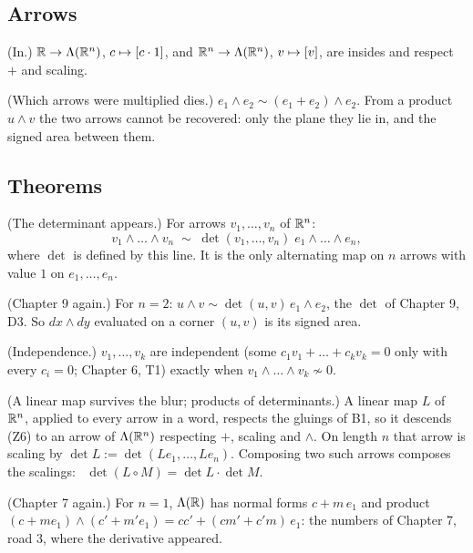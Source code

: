 \subsection*{Arrows}

\begin{lines}
\item[\lab{P5}] (In.) $\mathbb{R} \to \Lambda(\mathbb{R}^n)$, $c \mapsto [c \cdot 1]$, and $\mathbb{R}^n \to \Lambda(\mathbb{R}^n)$, $v \mapsto [v]$, are insides and respect $+$ and scaling.
\item[\lab{P6}] (Which arrows were multiplied dies.) $e_1 \wedge e_2 \sim (e_1 + e_2) \wedge e_2$. From a product $u \wedge v$ the two arrows cannot be recovered: only the plane they lie in, and the signed area between them.
\end{lines}

\subsection*{Theorems}

\begin{lines}
\item[\lab{T1}] (The determinant appears.) For arrows $v_1, \dots, v_n$ of $\mathbb{R}^n$:
\[
v_1 \wedge \dots \wedge v_n \;\sim\; \det(v_1, \dots, v_n)\; e_1 \wedge \dots \wedge e_n,
\]
where $\det$ is defined by this line. It is the only alternating map on $n$ arrows with value $1$ on $e_1, \dots, e_n$.
\item[\lab{T2}] (Chapter 9 again.) For $n = 2$: $u \wedge v \sim \det(u, v)\, e_1 \wedge e_2$, the $\det$ of Chapter 9, D3. So $dx \wedge dy$ evaluated on a corner $(u, v)$ is its signed area.
\item[\lab{T3}] (Independence.) $v_1, \dots, v_k$ are independent (some $c_1 v_1 + \dots + c_k v_k = 0$ only with every $c_i = 0$; Chapter 6, T1) exactly when $v_1 \wedge \dots \wedge v_k \not\sim 0$.
\item[\lab{T4}] (A linear map survives the blur; products of determinants.) A linear map $L$ of $\mathbb{R}^n$, applied to every arrow in a word, respects the gluings of B1, so it descends (Z6) to an arrow of $\Lambda(\mathbb{R}^n)$ respecting $+$, scaling and $\wedge$. On length $n$ that arrow is scaling by $\det L := \det(L e_1, \dots, L e_n)$. Composing two such arrows composes the scalings: \ $\det(L \circ M) = \det L \cdot \det M$.
\item[\lab{T5}] (Chapter 7 again.) For $n = 1$, $\Lambda(\mathbb{R})$ has normal forms $c + m\,e_1$ and product $(c + m e_1) \wedge (c' + m' e_1) = cc' + (cm' + c'm)\,e_1$: the numbers of Chapter 7, road 3, where the derivative appeared.
\end{lines}

